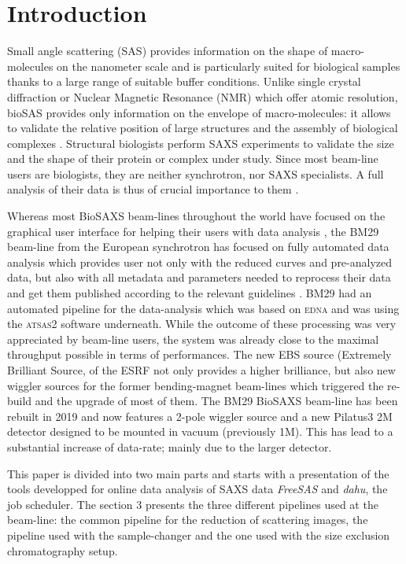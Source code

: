 \documentclass[preprint]{iucr}              %
\begin{document}
\section{Introduction}
Small angle scattering (SAS) provides information on the shape of macro-molecules on the nanometer scale and is particularly suited for biological samples thanks to a large range of suitable buffer conditions.
Unlike single crystal diffraction or Nuclear Magnetic Resonance (NMR) which offer atomic resolution, bioSAS provides only information on the envelope of macro-molecules: it allows to validate the relative position of large structures and the assembly of biological complexes \cite{biosaxs_rev2018}. 
Structural biologists perform SAXS experiments to validate the size and the shape of their protein or complex under study. 
Since most beam-line users are biologists, they are neither synchrotron, nor SAXS specialists.
A full analysis of their data is thus of crucial importance to them \cite{shibom}. 


Whereas most BioSAXS beam-lines throughout the world have focused on the graphical user interface for helping their users with data analysis \cite{dawn, als-biosaxs}, the BM29 beam-line from the European synchrotron \cite{BM29paper} has focused on fully automated data analysis which provides user not only with the reduced curves and pre-analyzed data, but also with all metadata and parameters needed to reprocess their data and get them published according to the relevant guidelines \cite{guidelines_2017}.
BM29 had an automated pipeline for the data-analysis which was based on \textsc{edna} \cite{edna} and was using the \textsc{atsas2} \cite{ATSAS2} software underneath. 
While the outcome of these processing was very appreciated by beam-line users, the system was already close to the maximal throughput possible in terms of performances. 
The new EBS source (Extremely Brilliant Source,  of the ESRF not only provides a higher brilliance, but also new wiggler sources for the former bending-magnet beam-lines which triggered the re-build and the upgrade of most of them. 
The BM29 BioSAXS beam-line has been rebuilt in 2019 and now features a 2-pole wiggler source and a new Pilatus3 2M detector designed to be mounted in vacuum (previously 1M). 
This has lead to a substantial increase of data-rate; mainly due to the larger detector. 

This paper is divided into two main parts and starts with a presentation of the tools developped for online data analysis of SAXS data \textit{FreeSAS} and \textit{dahu}, the job scheduler.
The section 3 presents the three different pipelines used at the beam-line: the common pipeline for the reduction of scattering images, the pipeline used with the sample-changer and the one used with the size exclusion chromatography setup.
\end{document}
